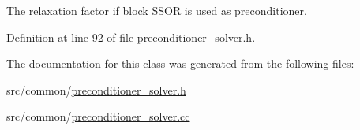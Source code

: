 The relaxation factor if block S\+S\+OR is used as preconditioner. 



Definition at line 92 of file preconditioner\+\_\+solver.\+h.



The documentation for this class was generated from the following files\+:\begin{DoxyCompactItemize}
\item 
src/common/\hyperlink{preconditioner__solver_8h}{preconditioner\+\_\+solver.\+h}\item 
src/common/\hyperlink{preconditioner__solver_8cc}{preconditioner\+\_\+solver.\+cc}\end{DoxyCompactItemize}
